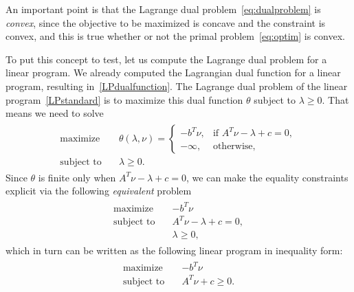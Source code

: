 An important point is that the Lagrange dual problem~\eqref{eq:dualproblem} is {\em convex}, since the objective to be maximized is concave and the constraint is convex, and this is true
whether or not the primal problem~\eqref{eq:optim} is convex.

\medskip
To put this concept to test, let us compute the Lagrange dual problem for a linear program. We already computed the Lagrangian dual function for a linear program, resulting in~\eqref{LPdualfunction}. The Lagrange dual problem of the linear program~\eqref{LPstandard} is to maximize this dual function $\theta$ subject to $\lambda \ge 0$. That means we need to solve
\begin{align}\label{eq:dualproblem1}
\begin{split}
 \text{maximize} & \quad \theta(\lambda,\nu) = 
 \begin{cases}
-b^T \nu, & \text{if } A^T \nu - \lambda +c = 0, \\
-\infty, & \text{otherwise},
\end{cases}\\
 \text{subject to} & \quad \lambda \ge 0.
\end{split}
\end{align}
Since $\theta$ is finite only when $A^T \nu - \lambda +c = 0$, we can make the equality constraints explicit via the following {\em equivalent} problem
\begin{align}\label{LPdual2}
\begin{split}
\text{maximize} \quad & -b^T \nu \\
\text{subject to} \quad & A^T \nu -\lambda + c = 0, \\
& \lambda \ge 0,
\end{split}
\end{align}
which in turn can be written as the following linear program in inequality form:
\begin{align}\label{LPdual3}
\begin{split}
\text{maximize} \quad & -b^T \nu \\
\text{subject to} \quad & A^T \nu + c \ge 0. 
\end{split}
\end{align}

